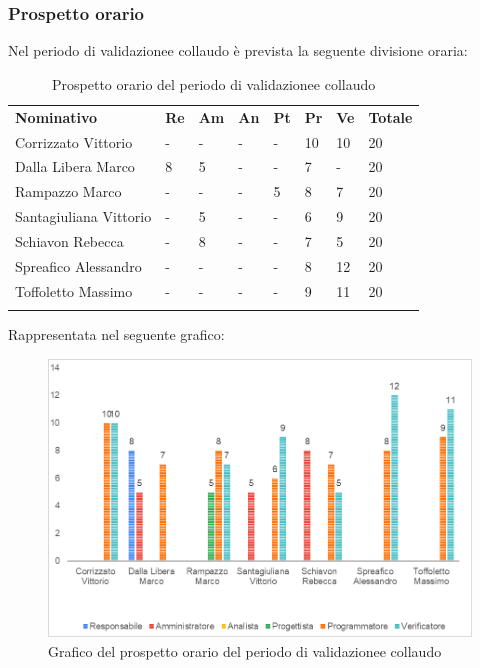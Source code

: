 \subsubsection{Prospetto orario}
Nel periodo di validazione\glosp e collaudo è prevista la seguente divisione oraria:
\begin{longtable} {				
		>{}p{40mm}  
		>{}p{8mm}
		>{}p{8mm}
		>{}p{8mm}
		>{}p{8mm}
		>{}p{8mm}
		>{}p{8mm}
		>{}p{12mm}			
	}			
	\rowcolor{gray!50}
	\textbf{Nominativo} & \textbf{Re} & \textbf{Am} & \textbf{An} & \textbf{Pt} & \textbf{Pr} & \textbf{Ve} & \textbf{Totale}	\TBstrut \\ [2mm]
	Corrizzato Vittorio & - & - & - & - & 10 & 10 & 20 \TBstrut \\ [2mm]
	Dalla Libera Marco & 8 & 5 & - & - & 7 & - & 20 \TBstrut \\ [2mm]
	Rampazzo Marco & - & - & - & 5 & 8 & 7 & 20 \TBstrut \\ [2mm]
	Santagiuliana Vittorio & - & 5 & - & - & 6 & 9 & 20 \TBstrut \\ [2mm]
	Schiavon Rebecca & - & 8 & - & - & 7 & 5 & 20 \TBstrut \\ [2mm]
	Spreafico Alessandro & - & - & - & - & 8 & 12 & 20 \TBstrut \\ [2mm]
	Toffoletto Massimo & - & - & - & - & 9 & 11 & 20 \TBstrut \\ [2mm]
	\rowcolor{white}
	\caption{Prospetto orario del periodo di validazione\glosp e collaudo}
\end{longtable}
Rappresentata nel seguente grafico:
\begin{figure} [H]
	\includegraphics[width=\linewidth]{./img/Grafici/7.png}
	\caption{Grafico del prospetto orario del periodo di validazione\glosp e collaudo}
\end{figure}
\pagebreak
